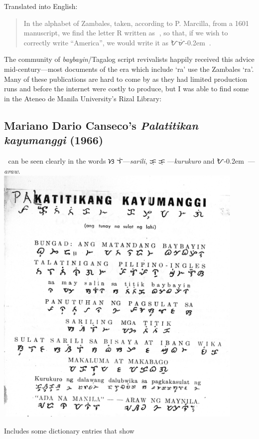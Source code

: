 \documentclass[a4paper,pagesize,openany,14pt,parskip=never]{scrbook}
\newcommand{\≈}{$\approx$}
\begin{document}
Translated into English:

\begin{quote}
    In the alphabet of Zambales, taken, according to P. Marcilla, from a 1601 manuscript, we find the letter R written as {\baybayinh ᜍ}, so that, if we wish to correctly write ``America'', we would write it as {\baybayinh ᜀᜋᜒ\kern-0.2emᜍᜒᜃ}.
\end{quote}

The community of {\em baybayin}/Tagalog script revivalists happily received this advice mid-century---most documents of the era which include `ra' use the Zambales `ra'. Many of these publications are hard to come by as they had limited production runs and before the internet were costly to produce, but I was able to find some in the Ateneo de Manila University's Rizal Library:
\newpage
\subsection{Mariano Dario Canseco's {\em Palatitikan kayumanggi} (1966)}
{\baybayinh ᜍ} can be seen clearly in the words {\baybayinh ᜐᜍᜒᜎᜒ}---{\em sarili}, {\baybayinh ᜃᜓᜍᜓᜃᜓᜍᜓ}---{\em kurukuro} and {\baybayinh ᜀ\kern-0.2emᜍᜏ}---{\em araw}.
 \\
\includegraphics[width=0.9\textwidth]{PK}

\newpage
Includes some dictionary entries that show {\baybayinh ᜍ}
\end{document}
